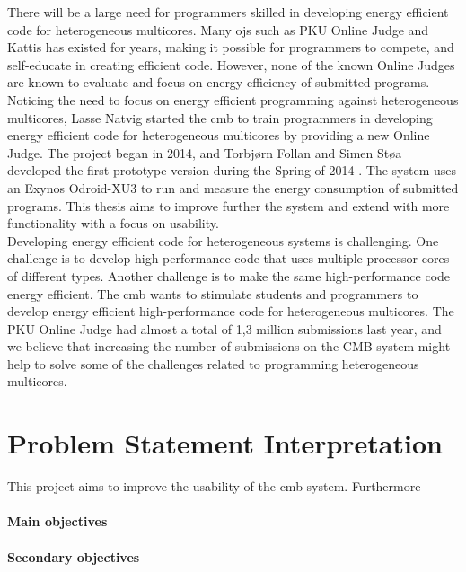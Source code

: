 There will be a large need for programmers skilled in developing energy efficient code for heterogeneous multicores. Many \gls{ojs} such as PKU Online Judge and Kattis has existed for years, making it possible for programmers to compete, and self-educate in creating efficient code. However, none of the known Online Judges are known to evaluate and focus on energy efficiency of submitted programs. Noticing the need to focus on energy efficient programming against heterogeneous multicores, Lasse Natvig started the \gls{cmb} to train programmers in developing energy efficient code for heterogeneous multicores by providing a new Online Judge. The project began in 2014, and Torbjørn Follan and Simen Støa developed the first prototype version during the Spring of 2014 \cite{mt:T&S}. The system uses an Exynos Odroid-XU3 \cite{m:XU3} to run and measure the energy consumption of submitted programs. This thesis aims to improve further the system and extend with more functionality with a focus on usability. \\

Developing energy efficient code for heterogeneous systems is challenging. One challenge is to develop high-performance code that uses multiple processor cores of different types. Another challenge is to make the same high-performance code energy efficient. The \gls{cmb} wants to stimulate students and programmers to develop energy efficient high-performance code for heterogeneous multicores. The PKU Online Judge had almost a total of 1,3 million submissions last year, and we believe that increasing the number of submissions on the CMB system might help to solve some of the challenges related to programming heterogeneous multicores. \\

\clearpage

\section{Problem Statement Interpretation}
\label{sec:rq}
This project aims to improve the usability of the \gls{cmb} system. Furthermore  


\paragraph*{Main objectives} \hfill


\paragraph*{Secondary objectives} \hfill



